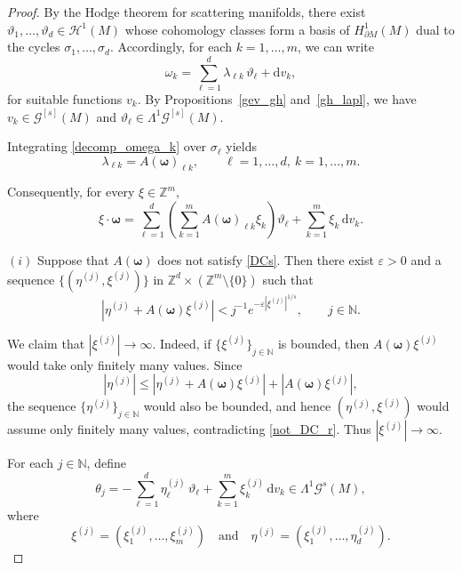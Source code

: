 \documentclass[10pt,a4paper]{amsart}
\begin{document}
	\begin{proof}
	By the Hodge theorem for scattering manifolds, there exist 
	$\vartheta_1,\dots,\vartheta_d \in \mathcal{H}^1(M)$ whose cohomology classes form a basis of 
	$H^1_{\partial M}(M)$ dual to the cycles $\sigma_1,\dots,\sigma_d$. 
	Accordingly, for each $k=1,\dots,m$, we can write
	\begin{equation}\label{decomp_omega_k}
		\omega_k = \sum_{\ell=1}^d \lambda_{\ell k}\,\vartheta_\ell
		+ \mathrm{d}v_k,
	\end{equation}
	for suitable functions $v_k$.  By Propositions~\ref{gev_gh} and~\ref{gh_lapl}, we have $v_k\in\mathscr{G}^{[s]}(M)$ and $\vartheta_\ell \in\mathsf{\Lambda}^1 \mathscr{G}^{[s]}(M)$.
	
	Integrating \eqref{decomp_omega_k} over $\sigma_\ell$ yields
	\[
	\lambda_{\ell k} = A(\boldsymbol{\omega})_{\ell k}, \qquad \ell=1,\dots,d,\ k=1,\dots,m.
	\]
	
	Consequently, for every $\xi\in\mathbb{Z}^m$,
	\begin{equation}\label{omega}
		\xi\cdot\boldsymbol{\omega} = \sum_{\ell=1}^d \left( \sum_{k=1}^m A(\boldsymbol{\omega})_{\ell k}\xi_k \right)\vartheta_\ell + \sum_{k=1}^m \xi_k\,\mathrm{d}v_k.
	\end{equation}
	
	\medskip
	
	\noindent
	$(i)$ Suppose that $A(\boldsymbol{\omega})$ does not satisfy \eqref{DCs}. 
	Then there exist $\varepsilon>0$ and a sequence
	\(\{(\eta^{(j)},\xi^{(j)})\}\) in \(\mathbb{Z}^d \times (\mathbb{Z}^m \setminus \{0\})\) such that
	\begin{equation}\label{not_DC_r}
		|\eta^{(j)} + A(\boldsymbol{\omega})\xi^{(j)}| < j^{-1} e^{-\varepsilon |\xi^{(j)}|^{1/s}}, \qquad j\in\mathbb{N}.
	\end{equation}
	
	We claim that $|\xi^{(j)}|\to\infty$. 
	Indeed, if $\{\xi^{(j)}\}_{j\in\mathbb{N}}$ is bounded, then $A(\boldsymbol{\omega})\xi^{(j)}$ would take only finitely many values. 
	Since
	\[
	|\eta^{(j)}| \le |\eta^{(j)} + A(\boldsymbol{\omega})\xi^{(j)}| + |A(\boldsymbol{\omega})\xi^{(j)}|,
	\]
	the sequence $\{\eta^{(j)}\}_{j\in\mathbb{N}}$ would also be bounded, and hence $(\eta^{(j)},\xi^{(j)})$ would assume only finitely many values, contradicting \eqref{not_DC_r}. 
	Thus $|\xi^{(j)}|\to\infty$.
	
	For each $j\in\mathbb{N}$, define
	\begin{equation}\label{vartheta_r}
		\theta_j = -\sum_{\ell=1}^d \eta^{(j)}_\ell\,\vartheta_\ell + \sum_{k=1}^m \xi^{(j)}_k\,\mathrm{d}v_k \in		\mathsf{\Lambda}^1 \mathscr{G}^s(M),
	\end{equation}
	where
	\[\xi^{(j)}=(\xi^{(j)}_1,\dots,\xi^{(j)}_m)\quad\text{and}\quad \eta^{(j)}=(\xi^{(j)}_1,\dots,\eta^{(j)}_d).\]
	

\end{proof}
\end{document}
